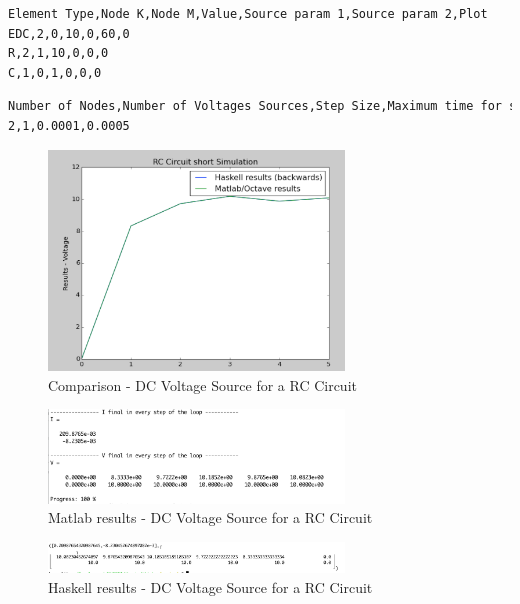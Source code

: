 \begin{lstlisting}[language=bash, label=getinfo, caption={Input data file for components in the Haskell implementation}, captionpos=b, label={lst:csv1capacitor}]
Element Type,Node K,Node M,Value,Source param 1,Source param 2,Plot
EDC,2,0,10,0,60,0
R,2,1,10,0,0,0
C,1,0,1,0,0,0
\end{lstlisting}


\begin{lstlisting}[language=bash, label=getinfo, caption={Input data file for components in the Haskell implementation}, captionpos=b, label={lst:csv1capacitorsimulation}]
Number of Nodes,Number of Voltages Sources,Step Size,Maximum time for simulation
2,1,0.0001,0.0005
\end{lstlisting}

\begin{figure}[H]
   \centering
   \includegraphics[width=0.7\textwidth]{img/capacitorcomparison.png}
   \caption{Comparison - DC Voltage Source for a RC Circuit}
   \label{capacitorcomparison}
\end{figure}

\begin{figure}[H]
   \centering
   \includegraphics[width=0.7\textwidth]{img/capacitorcomparisonmatlab.png}
   \caption{Matlab results - DC Voltage Source for a RC Circuit}
   \label{capacitorcomparisonmatlab}
\end{figure}

\begin{figure}[H]
   \centering
   \includegraphics[width=0.7\textwidth]{img/capacitorcomparisonhaskell.png}
   \caption{Haskell results - DC Voltage Source for a RC Circuit}
   \label{capacitorcomparisonhaskell}
\end{figure}


